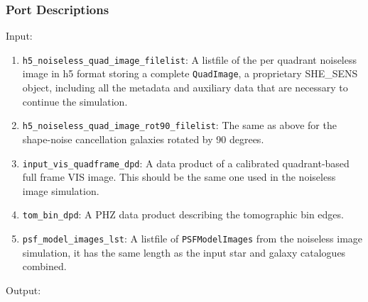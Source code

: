 \documentclass[11pt]{EuclidVIS}
\numberwithin{table}{section}
\numberwithin{figure}{section}
\begin{document}
\subsubsection{Port Descriptions}
Input:

\begin{enumerate}
    \item \texttt{h5\_noiseless\_quad\_image\_filelist}: A listfile of the per quadrant noiseless image in h5 format storing a complete \texttt{QuadImage}, a proprietary \textsc{SHE\_SENS} object, including all the metadata and auxiliary data that are necessary to continue the simulation.
    \item \texttt{h5\_noiseless\_quad\_image\_rot90\_filelist}: The same as above for the shape-noise cancellation galaxies rotated by 90 degrees.
    \item \texttt{input\_vis\_quadframe\_dpd}: A data product of a calibrated quadrant-based full frame VIS image. This should be the same one used in the noiseless image simulation.
    \item \texttt{tom\_bin\_dpd}: A PHZ data product describing the tomographic bin edges.
    \item \texttt{psf\_model\_images\_lst}: A listfile of \texttt{PSFModelImages} from the noiseless image simulation, it has the same length as the input star and galaxy catalogues combined.
\end{enumerate}

\noindent Output:
\end{document}
